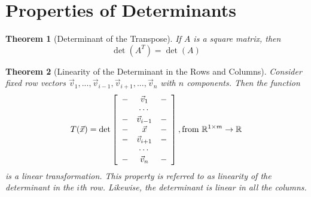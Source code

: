 \documentclass[10pt]{report}
\newtheorem{thm2}{Theorem}[section]
\begin{document}
\section{Properties of Determinants}
\begin{thm2}[Determinant of the Transpose]
If $A$ is a square matrix, then
$$\det (A^T) = \det (A)$$
\end{thm2}
\begin{thm2}[Linearity of the Determinant in the Rows and Columns]
Consider fixed row vectors $\vec{v}_1,..., \vec{v}_{i-1}, \vec{v}_{i+1}, ...,\vec{v}_n$ with $n$ components. Then the function
$$T(\vec{x}) = \det \left[\begin{array}{c c c}
- & \vec{v}_1 & -\\
& \cdots & \\
- & \vec{v}_{i-1} & -\\
- & \vec{x} & -\\
- & \vec{v}_{i+1} & -\\
& \cdots & \\
- & \vec{v}_n & -\\
\end{array}\right], \text{from } \mathbb{R}^{1\times m}\to \mathbb{R}$$
is a linear transformation. This property is referred to as linearity of the determinant in the $i$th row. Likewise, the determinant is linear in all the columns.
\end{thm2}
\end{document}
